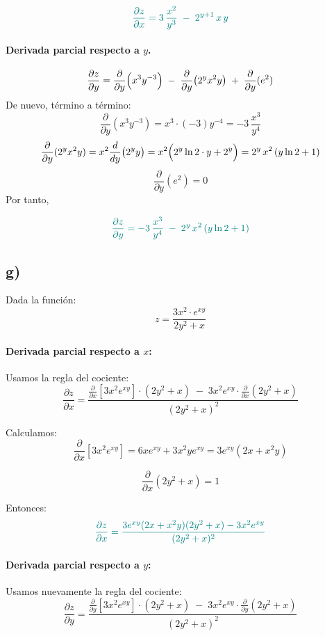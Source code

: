 \documentclass{article}
\begin{document}
\[
\color{teal}
\frac{\partial z}{\partial x}
=3\,\frac{x^2}{y^3}
\;-\;2^{y+1}\,x\,y
\]

\paragraph{Derivada parcial respecto a \(y\).}
\[
\frac{\partial z}{\partial y}
= \frac{\partial}{\partial y}\Bigl(x^3 y^{-3}\Bigr)
  \;-\;\frac{\partial}{\partial y}\bigl(2^y x^2 y\bigr)
  \;+\;\frac{\partial}{\partial y}(e^2)
\]
De nuevo, término a término:
\[
\frac{\partial}{\partial y}(x^3 y^{-3})
= x^3 \cdot (-3)y^{-4}
= -3\,\frac{x^3}{y^4}
\]
\[
\frac{\partial}{\partial y}(2^y x^2 y)
= x^2\frac{d}{dy}\bigl(2^y y\bigr)
= x^2\Bigl(2^y\ln 2\cdot y + 2^y\Bigr)
=2^y\,x^2\,(y\ln 2 +1)
\]
\[
\frac{\partial}{\partial y}(e^2)=0
\]
Por tanto,

\[
\color{teal}
\frac{\partial z}{\partial y}
=-3\,\frac{x^3}{y^4}
\;-\;2^y\,x^2\,(y\ln 2 +1)
\]
\subsection*{g)}
Dada la función:
\[
z = \frac{3x^2 \cdot e^{xy}}{2y^2 + x}
\]

\paragraph{Derivada parcial respecto a \(x\):}

Usamos la regla del cociente:
\[
\frac{\partial z}{\partial x}
= \frac{
\frac{\partial}{\partial x}[3x^2 e^{xy}] \cdot (2y^2 + x)
\;-\;
3x^2 e^{xy} \cdot \frac{\partial}{\partial x}(2y^2 + x)
}{
(2y^2 + x)^2
}
\]

Calculamos:
\[
\frac{\partial}{\partial x}[3x^2 e^{xy}]
= 6x e^{xy} + 3x^2 y e^{xy}
= 3e^{xy}(2x + x^2 y)
\]

\[
\frac{\partial}{\partial x}(2y^2 + x) = 1
\]

Entonces:
\[
\color{teal}
\frac{\partial z}{\partial x}
= \frac{
3e^{xy}(2x + x^2 y)(2y^2 + x) - 3x^2 e^{xy}
}{
(2y^2 + x)^2
}
\]

\paragraph{Derivada parcial respecto a \(y\):}

Usamos nuevamente la regla del cociente:
\[
\frac{\partial z}{\partial y}
= \frac{
\frac{\partial}{\partial y}[3x^2 e^{xy}] \cdot (2y^2 + x)
\;-\;
3x^2 e^{xy} \cdot \frac{\partial}{\partial y}(2y^2 + x)
}{
(2y^2 + x)^2
}
\]
\end{document}
